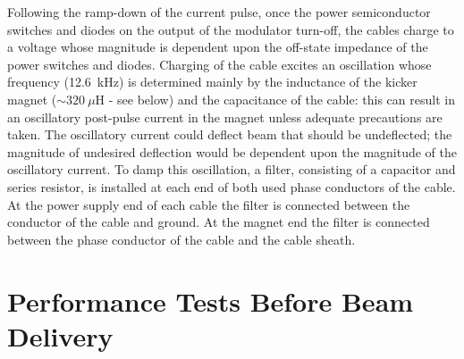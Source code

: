 \documentclass[aps,prab,twocolumn,superscriptaddress]{revtex4-1}
\begin{document}
Following the ramp-down of the current pulse, once the power semiconductor switches and diodes on the output of the modulator turn-off, the cables charge to a voltage whose magnitude is dependent upon the off-state impedance of the power switches and diodes. Charging of the cable excites an oscillation whose frequency (12.6~kHz) is determined mainly by the inductance of the kicker magnet ($\sim 320~\mu$H - see below) and the capacitance of the cable: this can result in an oscillatory post-pulse current in the magnet unless adequate precautions are taken. The oscillatory current could deflect beam that should be undeflected; the magnitude of undesired deflection would be dependent upon the magnitude of the oscillatory current. To damp this oscillation, a filter, consisting of a capacitor and series resistor, is installed at each end of both used phase conductors of the cable. At the power supply end of each cable the filter is connected between the conductor of the cable and ground. At the magnet end the filter is connected between the phase conductor of the cable and the cable sheath. 




\section{Performance Tests Before Beam Delivery}
\end{document}
